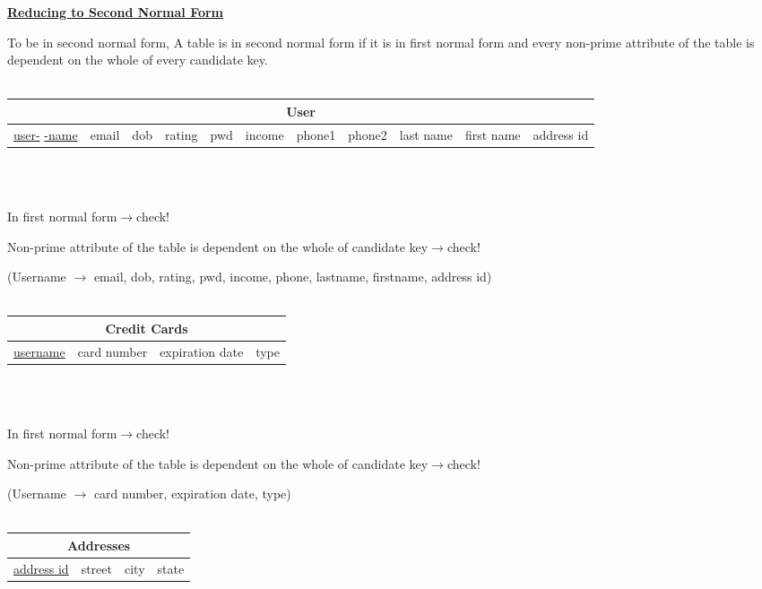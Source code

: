 \documentclass[12pt]{article}
\begin{document}
\par \textbf{\underline{Reducing to Second Normal Form}}
\par To be in second normal form, A table is in second normal form if it is in first normal form and every non-prime attribute of the table is dependent on the whole of every candidate key.\\\\
\begin{tabularx}{\textwidth}{|X|X|X|X|X|X|X|X|X|X|X|}
\hline
\multicolumn{11}{|c|}{User}\\\hline
\scriptsize \underline{user-} \underline{-name} & \scriptsize email & \scriptsize\cellcolor{green!25}dob & \scriptsize rating & \scriptsize pwd & \scriptsize income & \scriptsize\cellcolor{green!25} phone1 & \scriptsize\cellcolor{green!25} phone2 & \scriptsize\cellcolor{green!25} last name & \scriptsize\cellcolor{green!25} first name & \scriptsize\cellcolor{green!25} address id\\\hline
\end{tabularx}
~\\~\\
\par In first normal form\hfill$\rightarrow$check!
\par Non-prime attribute of the table is dependent on the whole of candidate key\hfill$\rightarrow$check!
\par(Username $\rightarrow$ email, dob, rating, pwd, income, phone, lastname, firstname, address id)\\
~\\
\begin{tabularx}{\textwidth}{|X|X|X|X|}
\hline
\multicolumn{4}{|c|}{Credit Cards}\\\hline
\underline{username} & card number & expiration date & type\\\hline
\end{tabularx}
~\\~\\
\par In first normal form\hfill$\rightarrow$check!
\par Non-prime attribute of the table is dependent on the whole of candidate key\hfill$\rightarrow$check!
\par (Username $\rightarrow$ card number, expiration date, type)\\
~\\
\begin{tabularx}{\textwidth}{|X|X|X|X|}
\hline
\multicolumn{4}{|c|}{\cellcolor{green!25}Addresses}\\\hline
\underline{address id} & street & city & state\\\hline
\end{tabularx}
\end{document}
